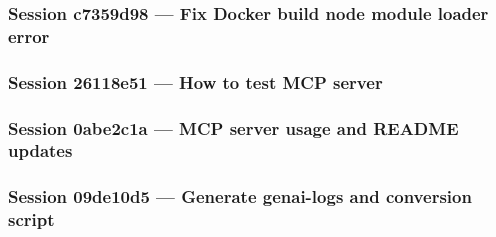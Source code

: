 \subsubsection*{Session c7359d98 — Fix Docker build node module loader error}


\subsubsection*{Session 26118e51 — How to test MCP server}


\subsubsection*{Session 0abe2c1a — MCP server usage and README updates}


\subsubsection*{Session 09de10d5 — Generate genai-logs and conversion script}

